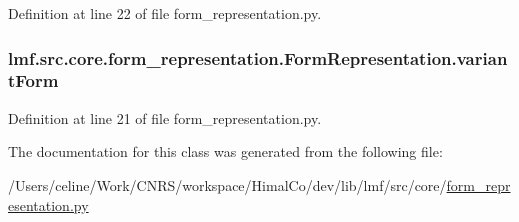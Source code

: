 Definition at line 22 of file form\+\_\+representation.\+py.

\hypertarget{classlmf_1_1src_1_1core_1_1form__representation_1_1_form_representation_ab271a76ed31e46ce4c1e66fad2651a73}{
\subsubsection[{variant\+Form}]{\setlength{\rightskip}{0pt plus 5cm}lmf.\+src.\+core.\+form\+\_\+representation.\+Form\+Representation.\+variant\+Form}}\label{classlmf_1_1src_1_1core_1_1form__representation_1_1_form_representation_ab271a76ed31e46ce4c1e66fad2651a73}


Definition at line 21 of file form\+\_\+representation.\+py.



The documentation for this class was generated from the following file\+:\begin{DoxyCompactItemize}
\item 
/\+Users/celine/\+Work/\+C\+N\+R\+S/workspace/\+Himal\+Co/dev/lib/lmf/src/core/\hyperlink{form__representation_8py}{form\+\_\+representation.\+py}\end{DoxyCompactItemize}
